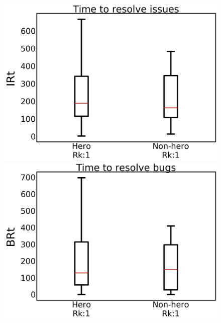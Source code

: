 \documentclass[sigconf]{acmart}
\theoremstyle{break}
\begin{document}
\begin{figure}[!t]
\begin{minipage}{.33\linewidth}
\centering
         \includegraphics[width=\linewidth,keepaspectratio]{./fig/IRt_w.png}
    \end{minipage}%
\begin{minipage}{.33\linewidth}
        \centering
        \includegraphics[width=\linewidth]{./fig/BRt_w.png}
    \end{minipage}%
\begin{minipage}{.33\linewidth}
        \centering

\end{minipage}
\end{figure}
\end{document}
